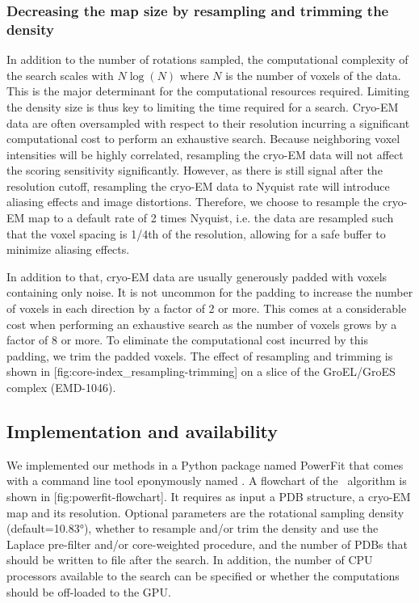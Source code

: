 \subsubsection{Decreasing the map size by resampling and trimming the density}

In addition to the number of rotations sampled, the computational complexity of
the search scales with $N \log\left( N \right)$ where $N$ is the number of
voxels of the data.
This is the major determinant for the computational resources required.
Limiting the density size is thus key to limiting the time required for a
search. Cryo-EM data are often oversampled with respect to their resolution
incurring a significant computational cost to perform an exhaustive search.
Because neighboring voxel intensities will be highly correlated, resampling the
cryo-EM data will not affect the scoring sensitivity significantly. However, as
there is still signal after the resolution cutoff, resampling the cryo-EM data
to Nyquist rate will introduce aliasing effects and image distortions.
Therefore, we choose to resample the cryo-EM map to a default rate of 2 times
Nyquist, i.e. the data are resampled such that the voxel spacing is 1/4th of
the resolution, allowing for a safe buffer to minimize aliasing effects. 

In addition to that, cryo-EM data are usually generously padded with voxels
containing only noise. It is not uncommon for the padding to increase the
number of voxels in each direction by a factor of 2 or more. This comes at a
considerable cost when performing an exhaustive search as the number of voxels
grows by a factor of 8 or more. To eliminate the computational cost incurred by
this padding, we trim the padded voxels. The effect of resampling and trimming
is shown in [fig:core-index_resampling-trimming] on a slice of
the GroEL/GroES complex (EMD-1046). 

\subsection{Implementation and availability}

We implemented our methods in a Python package named PowerFit that comes with a
command line tool eponymously named \powerfit. A flowchart of the \powerfit\
algorithm is shown in [fig:powerfit-flowchart]. It requires as input
a PDB structure, a cryo-EM map and its resolution. Optional parameters are the
rotational sampling density (default=10.83°), whether to resample and/or trim
the density and use the Laplace pre-filter and/or core-weighted procedure, and
the number of PDBs that should be written to file after the search. In
addition, the number of CPU processors available to the search can be specified
or whether the computations should be off-loaded to the GPU. 

